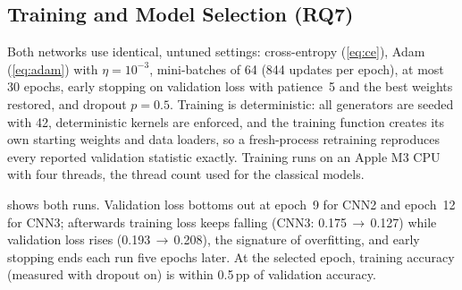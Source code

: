 \documentclass[conference]{IEEEtran}
\newcommand{\pp}{\,pp}                       %
\newcommand{\arrowc}{\,$\rightarrow$\,}
\begin{document}
\begin{table}[t]
  \centering
  \caption{Parameters, Compute and Receptive Field}
  \label{tab:arch}
  \setlength{\tabcolsep}{4pt}
\end{table}

\subsection{Training and Model Selection (RQ7)}
\label{sec:cnn-train}
Both networks use identical, untuned settings: cross-entropy (\cref{eq:ce}), Adam (\cref{eq:adam}) with $\eta=10^{-3}$,
mini-batches of 64 (844 updates per epoch), at most 30 epochs, early stopping on validation loss with patience~5 and the
best weights restored, and dropout $p=0.5$. Training is deterministic: all generators are seeded with 42, deterministic
kernels are enforced, and the training function creates its own starting weights and data loaders, so a fresh-process
retraining reproduces every reported validation statistic exactly. Training runs on an Apple M3 CPU with four threads,
the thread count used for the classical models.

 shows both runs. Validation loss bottoms out at epoch~9 for CNN2 and epoch~12 for CNN3; afterwards
training loss keeps falling (CNN3: 0.175\arrowc0.127) while validation loss rises (0.193\arrowc0.208), the signature of
overfitting, and early stopping ends each run five epochs later. At the selected epoch, training accuracy (measured with
dropout on) is within 0.5\pp{} of validation accuracy.
\end{document}
